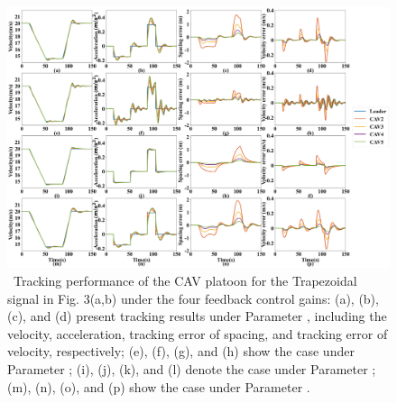 \documentclass[a4paper]{cas-sc}
\begin{document}
\begin{figure}
  \centering
  \includegraphics[width=14cm]{figs/fig4.png}
  \caption{~Tracking performance of the CAV platoon for the Trapezoidal signal in Fig. 3(a,b) under the four feedback control gains: (a), (b), (c), and (d) present tracking results under Parameter \uppercase\expandafter{}, including the velocity, acceleration, tracking error of spacing, and tracking error of velocity, respectively; (e), (f), (g), and (h) show the case under Parameter \uppercase\expandafter{}; (i), (j), (k), and (l) denote the case under Parameter \uppercase\expandafter{}; (m), (n), (o), and (p) show the case under Parameter \uppercase\expandafter{}.}
  \label{fig4}
\end{figure}
\end{document}
